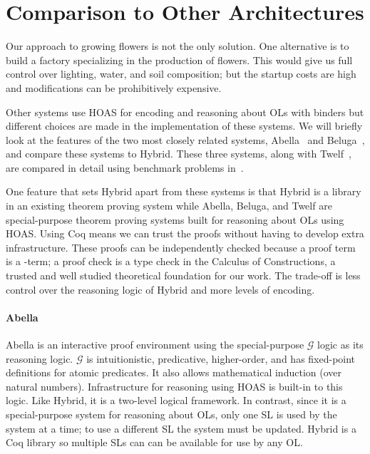 
\section{Comparison to Other Architectures}
\label{sec:hybridcompare}

\begin{sidestory}
Our approach to growing flowers is not the only solution. One alternative is to build a factory specializing in the production of flowers. This would give us full control over lighting, water, and soil composition; but the startup costs are high and modifications can be prohibitively expensive.
\end{sidestory}

Other systems use HOAS for encoding and reasoning about OLs with binders but different choices are made in the implementation of these systems. We will briefly look at the features of the two most closely related systems, Abella~\cite{Gacek:IJCAR08} and Beluga~\cite{Pientka:IJCAR10}, and compare these systems to Hybrid. These three systems, along with Twelf~\cite{TwelfSP}, are compared in detail using benchmark problems in~\cite{FMP:JAR15}.

One feature that sets Hybrid apart from these systems is that Hybrid is a library in an existing theorem proving system while Abella, Beluga, and Twelf are special-purpose theorem proving systems built for reasoning about OLs using HOAS. Using Coq means we can trust the proofs without having to develop extra infrastructure. These proofs can be independently checked because a proof term is a \lambda-term; a proof check is a type check in the Calculus of Constructions, a trusted and well studied theoretical foundation for our work. The trade-off is less control over the reasoning logic of Hybrid and more levels of encoding.

\paragraph{Abella}

Abella is an interactive proof environment using the special-purpose $\mathcal{G}$ logic as its reasoning logic. $\mathcal{G}$ is intuitionistic, predicative, higher-order, and has fixed-point definitions for atomic predicates. It also allows mathematical induction (over natural numbers). Infrastructure for reasoning using HOAS is built-in to this logic. Like Hybrid, it is a two-level logical framework. In contrast, since it is a special-purpose system for reasoning about OLs, only one SL is used by the system at a time; to use a different SL the system must be updated. Hybrid is a Coq library so multiple SLs can can be available for use by any OL.

